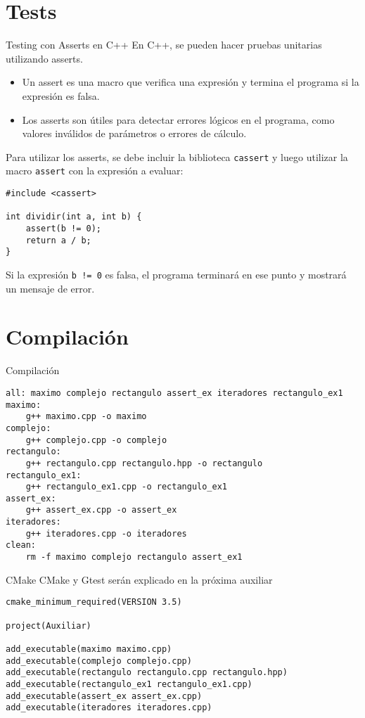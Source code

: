 \documentclass{beamer}
\begin{document}
\section{Tests}

\begin{frame}[fragile]{Testing con Asserts en C++}
En C++, se pueden hacer pruebas unitarias utilizando asserts. 

\begin{itemize}
\item Un assert es una macro que verifica una expresión y termina el programa si la expresión es falsa.
\item Los asserts son útiles para detectar errores lógicos en el programa, como valores inválidos de parámetros o errores de cálculo.
\end{itemize}

Para utilizar los asserts, se debe incluir la biblioteca \texttt{cassert} y luego utilizar la macro \texttt{assert} con la expresión a evaluar:

\begin{verbatim}
#include <cassert>

int dividir(int a, int b) {
    assert(b != 0);
    return a / b;
}
\end{verbatim}

Si la expresión \texttt{b != 0} es falsa, el programa terminará en ese punto y mostrará un mensaje de error.

\end{frame}

\section{Compilación}

\begin{frame}[fragile]{Compilación}
    \begin{verbatim}
all: maximo complejo rectangulo assert_ex iteradores rectangulo_ex1 
maximo:
	g++ maximo.cpp -o maximo
complejo:
	g++ complejo.cpp -o complejo
rectangulo:
	g++ rectangulo.cpp rectangulo.hpp -o rectangulo
rectangulo_ex1:
	g++ rectangulo_ex1.cpp -o rectangulo_ex1
assert_ex:
	g++ assert_ex.cpp -o assert_ex
iteradores:
	g++ iteradores.cpp -o iteradores
clean:
	rm -f maximo complejo rectangulo assert_ex1
    \end{verbatim}
\end{frame}

\begin{frame}[fragile]{CMake}
    CMake y Gtest serán explicado en la próxima auxiliar

\begin{verbatim}
cmake_minimum_required(VERSION 3.5)

project(Auxiliar)

add_executable(maximo maximo.cpp)
add_executable(complejo complejo.cpp)
add_executable(rectangulo rectangulo.cpp rectangulo.hpp)
add_executable(rectangulo_ex1 rectangulo_ex1.cpp)
add_executable(assert_ex assert_ex.cpp)
add_executable(iteradores iteradores.cpp)

\end{verbatim}
\end{frame}
\end{document}
